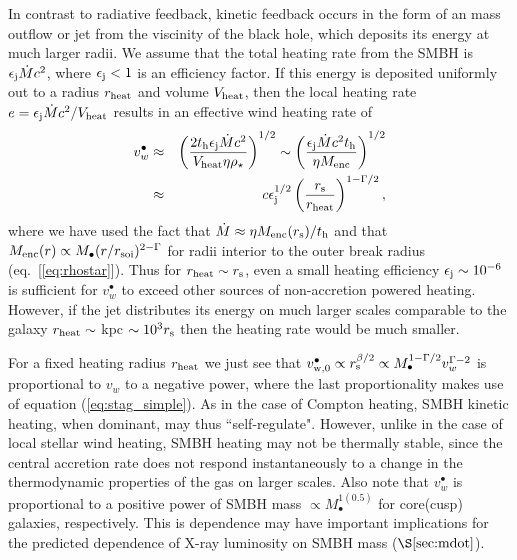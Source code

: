 \documentclass[usenatbib,fleqn]{mn2e}
\begin{document}
In contrast to radiative feedback, kinetic feedback occurs in the form
of an mass outflow or jet from the viscinity of the black hole, which
deposits its energy at much larger radii.  We assume that the total
heating rate from the SMBH is $\epsilon_{\rm j} \dot{M}c^{2}$, where
$\epsilon_{\rm j} < 1$ is an efficiency factor.  If this energy is
deposited uniformly out to a radius $r_{\rm heat}$ and volume $V_{\rm
heat}$, then the local heating rate $e = \epsilon_{\rm
j}\dot{M}c^{2}/V_{\rm heat}$ results in an effective wind heating rate
of
\begin{eqnarray} v_{w}^{\bullet} &\approx& \left(\frac{2t_{\rm
h}\epsilon_{\rm j}\dot{M}c^{2}}{V_{\rm heat}\eta
\rho_{\star}}\right)^{1/2} \sim \left(\frac{\epsilon_{\rm
j}\dot{M}c^{2}t_{\rm h}}{\eta M_{\rm enc}}\right)^{1/2} \nonumber \\
&\approx& c\epsilon_{\rm j}^{1/2}\left(\frac{r_{\rm s}}{r_{\rm
heat}}\right)^{1-\Gamma/2},
\end{eqnarray} where we have used the fact that $\dot{M} \approx \eta
M_{\rm enc}(r_{\rm s})/t_{\rm h}$ and that $M_{\rm enc}(r) \propto
M_{\bullet}(r/r_{\rm soi})^{2-\Gamma}$ for radii interior to the outer
break radius (eq.~[\ref{eq:rhostar}]).  Thus for $r_{\rm heat} \sim
r_{\rm s}$, even a small heating efficiency $\epsilon_{\rm j} \sim
10^{-6}$ is sufficient for $v_{w}^{\bullet}$ to exceed other
sources of non-accretion powered heating.  However, if the jet
distributes its energy on much larger scales comparable to the galaxy
$r_{\rm heat} \sim $ kpc $\sim 10^{3}r_{\rm s}$ then the heating rate
would be much smaller.

For a fixed heating radius $r_{\rm heat}$ we just see that $v_{\rm
  w,0}^{\bullet} \propto r_{\rm s}^{\beta/2} \propto
M_{\bullet}^{1-\Gamma/2}v_{w}^{\Gamma-2}$ is proportional to
$v_{w}$ to a negative power, where the last proportionality makes
use of equation (\ref{eq:stag_simple}).  As in the case of Compton
heating, SMBH kinetic heating, when dominant, may thus
``self-regulate".  However, unlike in the case of local stellar wind
heating, SMBH heating may not be thermally stable, since the central
accretion rate does not respond instantaneously to a change in the
thermodynamic properties of the gas on larger scales.  Also note that
$v_{w}^{\bullet}$ is proportional to a positive power of SMBH
mass $\propto M_{\bullet}^{1(0.5)}$ for core(cusp) galaxies,
respectively.  This is dependence may have important implications for
the predicted dependence of X-ray luminosity on SMBH mass
($\S\ref{sec:mdot}$).
\end{document}
